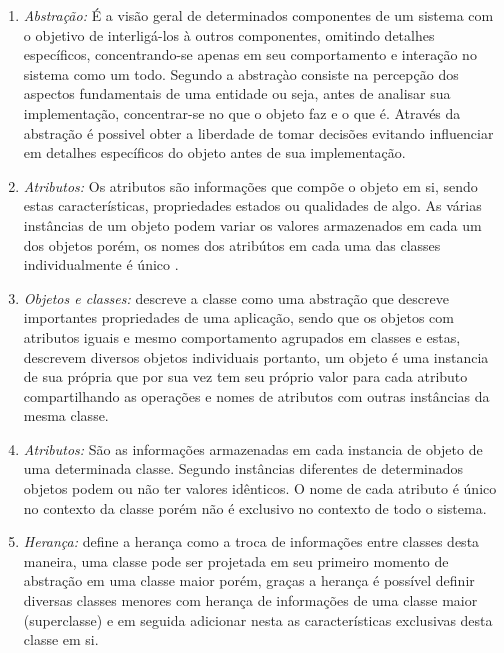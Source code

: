 \begin{enumerate}
\item \textit{Abstração:} É a visão geral de determinados componentes de um sistema com o objetivo de interligá-los à outros componentes, omitindo detalhes específicos, concentrando-se apenas em seu comportamento e interação no sistema como um todo. Segundo \cite{rumbaugh1991object} a abstraçào consiste na percepção dos aspectos fundamentais de uma entidade ou seja, antes de analisar sua implementação, concentrar-se no que o objeto faz e o que é. Através da abstração é possivel obter a liberdade de tomar decisões evitando influenciar em detalhes específicos do objeto antes de sua implementação.

\item \textit{Atributos:} 
Os atributos são informações que compõe o objeto em si, sendo estas características, propriedades estados ou qualidades de algo. As várias instâncias de um objeto podem variar os valores armazenados em cada um dos objetos porém, os nomes dos atribútos em cada uma das classes individualmente é único \cite{rumbaugh1991object}.

\item \textit{Objetos e classes:}  
\cite{rumbaugh1991object} descreve a classe como uma abstração que descreve importantes propriedades de uma aplicação, sendo que os objetos com atributos iguais e mesmo comportamento agrupados em classes e estas, descrevem diversos objetos individuais portanto, um objeto é uma instancia de sua própria que por sua vez tem seu próprio valor para cada atributo compartilhando as operações e nomes de atributos com outras instâncias da mesma classe.

\item \textit{Atributos:} São as informações armazenadas em cada instancia de objeto de uma determinada classe. Segundo \cite{rumbaugh1991object} instâncias diferentes de determinados objetos podem ou não ter valores idênticos. O nome de cada atributo é único no contexto da classe porém não é exclusivo no contexto de todo o sistema.

\item \textit{Herança:} \cite{rumbaugh1991object} define a herança como a troca de informações entre classes desta maneira, uma classe pode ser projetada em seu primeiro momento de abstração em uma classe maior porém, graças a herança é possível definir diversas classes menores com herança de informações de uma classe maior (superclasse) e em seguida adicionar nesta as características exclusivas desta classe em si. 


\end{enumerate}
